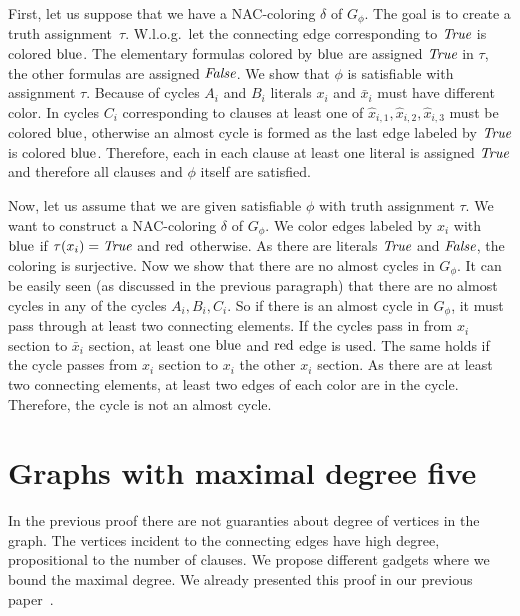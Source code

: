 First, let us suppose that we have a NAC-coloring \( \delta \) of \( G_\phi \).
The goal is to create a truth assignment~\( \tau \).
W.l.o.g.\ let the connecting edge corresponding to \( \textit{True} \) is colored \( \text{blue} \).
The elementary formulas colored by \( \text{blue} \) are assigned \( \textit{True} \) in \( \tau \),
the other formulas are assigned \( \textit{False} \).
We show that \( \phi \) is satisfiable with assignment \( \tau \).
Because of cycles \( A_i \) and \( B_i \) literals \( x_i \) and \( \bar{x}_i \)
must have different color. In cycles \( C_i \) corresponding to clauses
at least one of \( \hat{x}_{i,1}, \hat{x}_{i,2}, \hat{x}_{i,3} \) must be colored \( \text{blue} \),
otherwise an almost cycle is formed as the last edge labeled by \( \textit{True} \) is colored \( \text{blue} \).
Therefore, each in each clause at least one literal is assigned \( \textit{True} \)
and therefore all clauses and \( \phi \) itself are satisfied.

Now, let us assume that we are given satisfiable \( \phi \)
with truth assignment \( \tau \).
We want to construct a NAC-coloring \( \delta \) of \( G_\phi \).
We color edges labeled by \( x_i \) with \( \text{blue} \) if \( \tau(x_i) = \textit{True} \)
and \( \text{red} \) otherwise.
As there are literals \( \textit{True} \) and \( \textit{False} \), the coloring is surjective.
Now we show that there are no almost cycles in \( G_\phi \).
It can be easily seen (as discussed in the previous paragraph)
that there are no almost cycles in any of the cycles \( A_i, B_i, C_i \).
So if there is an almost cycle in \( G_\phi \), it must pass through
at least two connecting elements.
If the cycles pass in 
from \( x_i \) section to \( \bar{x}_i \) section, at least one \( \text{blue} \)
and \( \text{red} \) edge is used. The same holds if the cycle passes
from \( x_i \) section to \( x_i \) the other \( x_i \) section.
As there are at least two connecting elements, at least two edges of each color are in the cycle.
Therefore, the cycle is not an almost cycle.


\section{Graphs with maximal degree five}

In the previous proof there are not guaranties about
degree of vertices in the graph. The vertices incident to the connecting edges
have high degree, propositional to the number of clauses.
We propose different gadgets where we bound the maximal degree.
We already presented this proof in our previous paper~\cite{my_paper}.

